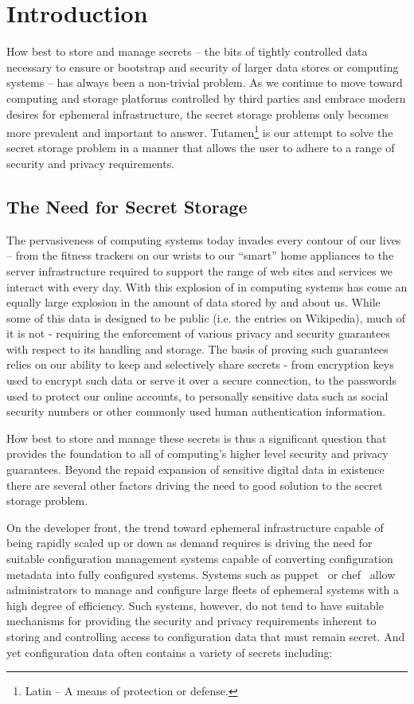 \section{Introduction}
\label{sec:intro}

How best to store and manage secrets -- the bits of tightly controlled
data necessary to ensure or bootstrap and security of larger data
stores or computing systems -- has always been a non-trivial
problem. As we continue to move toward computing and storage platforms
controlled by third parties and embrace modern desires for ephemeral
infrastructure, the secret storage problems only becomes more
prevalent and important to answer. Tutamen\footnote{Latin -- A means
  of protection or defense.} is our attempt to solve the secret
storage problem in a manner that allows the user to adhere to a range
of security and privacy requirements.

\subsection{The Need for Secret Storage}

The pervasiveness of computing systems today invades every contour of
our lives -- from the fitness trackers on our wrists to our ``smart''
home appliances to the server infrastructure required to support the
range of web sites and services we interact with every day. With this
explosion of in computing systems has come an equally large explosion
in the amount of data stored by and about us. While some of this data
is designed to be public (i.e. the entries on Wikipedia), much of it
is not - requiring the enforcement of various privacy and security
guarantees with respect to its handling and storage. The basis of
proving such guarantees relies on our ability to keep and selectively
share secrets - from encryption keys used to encrypt such data or
serve it over a secure connection, to the passwords used to protect
our online accounts, to personally sensitive data such as social
security numbers or other commonly used human authentication
information.

How best to store and manage these secrets is thus a significant
question that provides the foundation to all of computing's higher
level security and privacy guarantees. Beyond the repaid expansion of
sensitive digital data in existence there are several other factors
driving the need to good solution to the secret storage problem.

On the developer front, the trend toward ephemeral infrastructure
capable of being rapidly scaled up or down as demand requires is
driving the need for suitable configuration management systems capable
of converting configuration metadata into fully configured
systems. Systems such as puppet~\cite{puppet} or chef~\cite{chef}
allow administrators to manage and configure large fleets of ephemeral
systems with a high degree of efficiency. Such systems, however, do
not tend to have suitable mechanisms for providing the security and
privacy requirements inherent to storing and controlling access to
configuration data that must remain secret. And yet configuration data
often contains a variety of secrets including:

